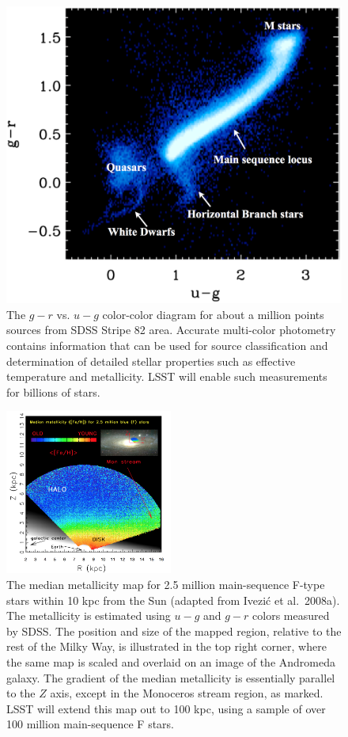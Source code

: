 \documentclass{emulateapj}
\begin{document}
\begin{figure}
\includegraphics[width=1.0\hsize,clip]{MarlaUGR.png}
\caption{The $g-r$ vs. $u-g$ color-color diagram for about a million points sources 
from SDSS Stripe 82 area. Accurate multi-color photometry 
contains information that can be used for source classification and determination of 
detailed stellar properties such as effective temperature and metallicity. LSST will 
enable such measurements for billions of stars.} 
\label{Fig:FeH}
\end{figure}



\begin{figure}
\includegraphics[width=0.49\textwidth,clip]{panelsLSST.png}
\caption{
The median metallicity map for 2.5 million main-sequence F-type stars within 10 kpc 
from the Sun (adapted from Ivezi\'{c} et al.~2008a). The metallicity is estimated using 
$u-g$ and $g-r$ colors measured by SDSS. The position and size of the mapped 
region, relative to the rest of the Milky Way, is illustrated in the top right 
corner, where the same map is scaled and overlaid on an image of the Andromeda 
galaxy. The gradient of the median metallicity is essentially parallel
to the $Z$ axis, except in the Monoceros stream region, as marked. LSST 
will extend this map out to 100 kpc, using a sample of over 100 million 
main-sequence F stars.} 
\label{Fig:FeH3}
\end{figure}
\end{document}
